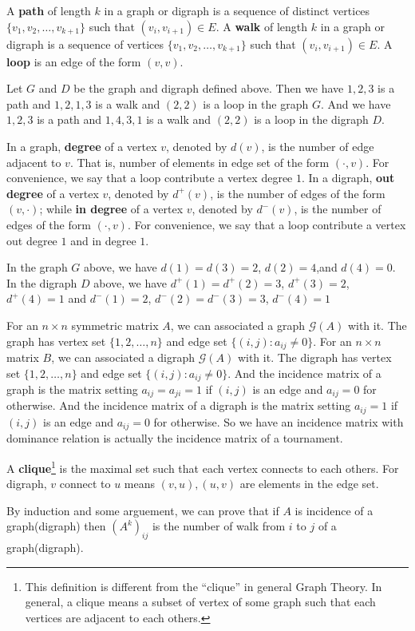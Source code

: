 \begin{definition}
A \textbf{path} of length $k$ in a graph or digraph is a sequence of distinct vertices $\{v_1,v_2,\ldots ,v_{k+1}\}$ such that $(v_i,v_{i+1})\in E$. A \textbf{walk} of length $k$ in a graph or digraph is a sequence of vertices $\{v_1,v_2,\ldots ,v_{k+1}\}$ such that $(v_i,v_{i+1})\in E$. A \textbf{loop} is an edge of the form $(v,v)$.
\end{definition}
\begin{example}
Let $G$ and $D$ be the graph and digraph defined above. Then we have $1,2,3$ is a path and $1,2,1,3$ is a walk and $(2,2)$ is a loop in the graph $G$. And we have $1,2,3$ is a path and $1,4,3,1$ is a walk and $(2,2)$ is a loop in the digraph $D$.
\end{example}
\begin{definition}
In a graph, \textbf{degree} of a vertex $v$, denoted by $d(v)$, is the number of edge adjacent to $v$. That is, number of elements in edge set of the form $(\cdot ,v)$. For convenience, we say that a loop contribute a vertex degree $1$. In a digraph, \textbf{out degree} of a vertex $v$, denoted by $d^+(v)$, is the number of edges of the form $(v,\cdot )$; while \textbf{in degree} of a vertex $v$, denoted by $d^-(v)$, is the number of edges of the form $(\cdot ,v)$. For convenience, we say that a loop contribute a vertex out degree $1$ and in degree $1$.
\end{definition}
\begin{example}
In the graph $G$ above, we have $d(1)=d(3)=2$, $d(2)=4$,and $d(4)=0$. In the digraph $D$ above, we have $d^+(1)=d^+(2)=3$, $d^+(3)=2$, $d^+(4)=1$ and $d^-(1)=2$, $d^-(2)=d^-(3)=3$, $d^-(4)=1$
\end{example}
\begin{definition}
For an $n\times n$ symmetric matrix $A$, we can associated a graph $\mathcal{G}(A)$ with it. The graph has vertex set $\{1,2,\ldots ,n\}$ and edge set $\{(i,j):a_{ij}\neq 0\}$. For an $n\times n$ matrix $B$, we can associated a digraph $\mathcal{G}(A)$ with it. The digraph has vertex set $\{1,2,\ldots ,n\}$ and edge set $\{(i,j):a_{ij}\neq 0\}$. And the incidence matrix of a graph is the matrix setting $a_{ij}=a_{ji}=1$ if $(i,j)$ is an edge and $a_{ij}=0$ for otherwise. And the incidence matrix of a digraph is the matrix setting $a_{ij}=1$ if $(i,j)$ is an edge and $a_{ij}=0$ for otherwise. So we have an incidence matrix with dominance relation is actually the incidence matrix of a tournament.
\end{definition}
\begin{definition}
A \textbf{clique}\footnote{This definition is different from the ``clique'' in general Graph Theory. In general, a clique means a subset of vertex of some graph such that each vertices are adjacent to each others.} is the maximal set such that each vertex connects to each others. For digraph, $v$ connect to $u$ means $(v,u),(u,v)$ are elements in the edge set.
\end{definition}
\begin{note}
By induction and some arguement, we can prove that if $A$ is incidence of a graph(digraph) then $(A^k)_{ij}$ is the number of walk from $i$ to $j$ of a graph(digraph).
\end{note}
